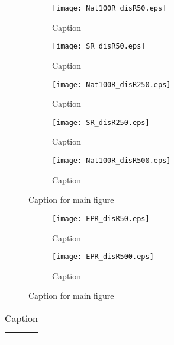 \begin{figure}[H]
    \centering
    \begin{subfigure}[b]{0.49\textwidth}
        \centering
        \texttt{[image: Nat100R\_disR50.eps]}
        \caption{Caption}
        \label{fig:Nat100R50}
    \end{subfigure}
    \hfill
    \begin{subfigure}[b]{0.49\textwidth}
        \centering
        \texttt{[image: SR\_disR50.eps]}
        \caption{Caption}
        \label{fig:SR50}
    \end{subfigure}
    \hfill
    \begin{subfigure}[b]{0.49\textwidth}
        \centering
        \texttt{[image: Nat100R\_disR250.eps]}
        \caption{Caption}
        \label{fig:Nat100R250}
    \end{subfigure}
    \hfill
    \begin{subfigure}[b]{0.49\textwidth}
        \centering
        \texttt{[image: SR\_disR250.eps]}
        \caption{Caption}
        \label{fig:SR250}
    \end{subfigure}
    \hfill
    \begin{subfigure}[b]{0.49\textwidth}
        \centering
        \texttt{[image: Nat100R\_disR500.eps]}
        \caption{Caption}
        \label{fig:Nat100R500}
    \end{subfigure}
    \hspace*{\fill}
    \caption{Caption for main figure}
    \label{fig:Nat100R}
\end{figure}

\begin{figure}[H]
    \centering
    \begin{subfigure}[b]{0.49\textwidth}
        \centering
        \texttt{[image: EPR\_disR50.eps]}
        \caption{Caption}
        \label{fig:EPR50}
    \end{subfigure}
    \hfill
    \begin{subfigure}[b]{0.49\textwidth}
        \centering
        \texttt{[image: EPR\_disR500.eps]}
        \caption{Caption}
        \label{fig:EPR500}
    \end{subfigure}
    \caption{Caption for main figure}
    \label{fig:EPR}
\end{figure}

\begin{table}[]
    \centering
    \begin{tabular}{c|c}
         &  \\
         & 
    \end{tabular}
    \caption{Caption}
    \label{tab:my_label}
\end{table}

